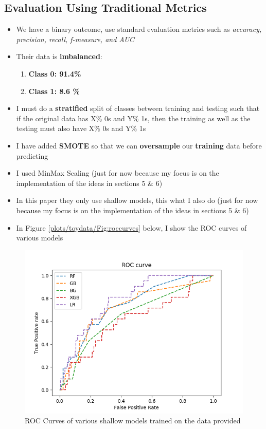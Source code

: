 \documentclass{article}
\begin{document}
\subsection{Evaluation Using Traditional Metrics}
\begin{itemize}
\item We have a binary outcome, use standard evaluation metrics such as \textit{accuracy, precision, recall, f-measure, and AUC}
\item Their data is \textbf{imbalanced}:
\begin{enumerate}
\item \textbf{Class 0: 91.4\%}
\item \textbf{Class 1: 8.6 \%}
\end{enumerate}

\item I must do a \textbf{stratified} split of classes between training and testing such that if the original data has X\% 0s and Y\% 1s, then the training as well as the testing must also have X\% 0s and Y\%  1s

\item I have added \textbf{SMOTE} so that we can \textbf{oversample} our \textbf{training} data before predicting

\item I used MinMax Scaling (just for now because my focus is on the implementation of the ideas in sections 5 \& 6)

\item In this paper they only use shallow models, this what I also do (just for now because my focus is on the implementation of the ideas in sections 5 \& 6)

\item In Figure \ref{plots/toydata/Fig:roccurves} below, I show the ROC curves of various models
\end{itemize}

\begin{figure}[H]
\centering
\includegraphics[scale=0.5]{plots/toydata/roccurves.png}
\caption{ROC Curves of various shallow models trained on the data provided}
\label{Fig:roccurves}
\end{figure}
\end{document}
